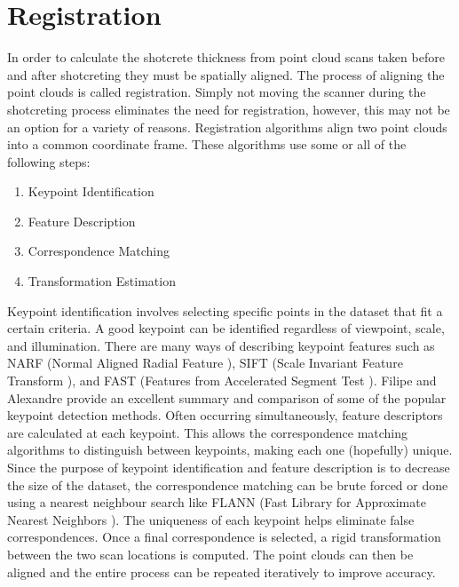 \section{Registration}

In order to calculate the shotcrete thickness from point cloud scans taken before and after shotcreting they must be spatially aligned. The process of aligning the point clouds is called registration. Simply not moving the scanner during the shotcreting process eliminates the need for registration, however, this may not be an option for a variety of reasons. Registration algorithms align two point clouds into a common coordinate frame. These algorithms use some or all of the following steps: 

\begin{enumerate}
    \item Keypoint Identification
    \item Feature Description
    \item Correspondence Matching
    \item Transformation Estimation
\end{enumerate}

Keypoint identification involves selecting specific points in the dataset that fit a certain criteria. A good keypoint can be identified regardless of viewpoint, scale, and illumination. There are many ways of describing keypoint features such as NARF (Normal Aligned Radial Feature \cite{narf}), SIFT (Scale Invariant Feature Transform \cite{sift}), and FAST (Features from Accelerated Segment Test \cite{fast}). Filipe and Alexandre provide an excellent summary and comparison of some of the popular keypoint detection methods\cite{keypoint}. Often occurring simultaneously, feature descriptors are calculated at each keypoint. This allows the correspondence matching algorithms to distinguish between keypoints, making each one (hopefully) unique. Since the purpose of keypoint identification and feature description is to decrease the size of the dataset, the correspondence matching can be brute forced or done using a nearest neighbour search like FLANN (Fast Library for Approximate Nearest Neighbors \cite{flann}). The uniqueness of each keypoint helps eliminate false correspondences. Once a final correspondence is selected, a rigid transformation between the two scan locations is computed. The point clouds can then be aligned and the entire process can be repeated iteratively to improve accuracy.\\

